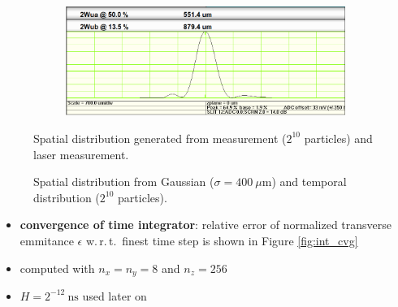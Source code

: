 \begin{center}
\begin{figure}[H]
   \begin{subfigure}{0.4\textwidth}
      
   \end{subfigure}
   \qquad \qquad \qquad
   \begin{subfigure}{0.5\textwidth}
      \includegraphics[width=\textwidth]{fig/laser}
   \end{subfigure}
   \caption{Spatial distribution generated from measurement ($2^{10}$ particles) and laser measurement.}
   \label{fig:gen_sp}
\end{figure}
\end{center}

\begin{center}
\begin{figure}[H]
   \begin{subfigure}{0.4\textwidth}
      
   \end{subfigure}
   \qquad \qquad \qquad
   \begin{subfigure}{0.4\textwidth}
      
   \end{subfigure}
   \caption{Spatial distribution from Gaussian ($\sigma = 400\ \mu \mathrm{m}$) and temporal distribution ($2^{10}$ particles).}
   \label{fig:gen_tmp}
\end{figure}
\end{center}

\newpage

\begin{itemize}
   \item \textbf{convergence of time integrator}: relative error of normalized transverse emmitance $\epsilon$ w.\,r.\,t.\ finest time step is shown in Figure \ref{fig:int_cvg}
   \item computed with $n_x=n_y=8$ and $n_z=256$
   \item $H=2^{-12}\ \mathrm{ns}$ used later on
\end{itemize}

